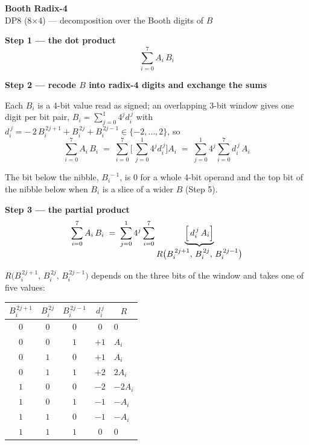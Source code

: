 \documentclass[fleqn]{article}
\newcommand{\Rf}{R\bigl(B_i^{\,2j+1},\, B_i^{\,2j},\, B_i^{\,2j-1}\bigr)}
\begin{document}
\begin{center}
{\LARGE \textbf{Booth Radix-4}}\\[4pt]
{\large DP8 (8$\times$4) --- decomposition over the Booth digits of $B$}
\end{center}

\vspace{1.5em}

\noindent\textbf{Step 1 --- the dot product}
\[
\sum_{i=0}^{7} A_i \, B_i
\]

\vspace{0.5em}

\noindent\textbf{Step 2 --- recode $B$ into radix-4 digits and exchange the sums}

\noindent Each $B_i$ is a 4-bit value read as signed; an overlapping 3-bit window gives one
digit per bit pair, $B_i = \sum_{j=0}^{1} 4^{j} d_i^{\,j}$ with
$d_i^{\,j} = -\,2\,B_i^{\,2j+1} + B_i^{\,2j} + B_i^{\,2j-1} \in \{-2,\dots,2\}$, so
\[
\sum_{i=0}^{7} A_i \, B_i
  \;=\; \sum_{i=0}^{7} \Biggl[\, \sum_{j=0}^{1} 4^{j} d_i^{\,j} \Biggr] A_i
  \;=\; \sum_{j=0}^{1} 4^{j} \sum_{i=0}^{7} d_i^{\,j} \, A_i
\]

\noindent The bit below the nibble, $B_i^{\,-1}$, is $0$ for a whole 4-bit operand and the
top bit of the nibble below when $B_i$ is a slice of a wider $B$ (Step 5).

\vspace{0.5em}

\noindent\textbf{Step 3 --- the partial product}
\[
\sum_{i=0}^{7} A_i \, B_i
  \;=\; \sum_{j=0}^{1} 4^{j} \sum_{i=0}^{7}
        \underbrace{\Bigl[\, d_i^{\,j} \, A_i \Bigr]}_{\textstyle \Rf}
\]

\noindent $\Rf$ depends on the three bits of the window and takes one of five values:

\vspace{0.5em}

\begin{center}
\renewcommand{\arraystretch}{1.2}
\begin{tabular}{c c c | c | l}
$B_i^{\,2j+1}$ & $B_i^{\,2j}$ & $B_i^{\,2j-1}$ & $d_i^{\,j}$ & \multicolumn{1}{c}{$R$} \\
\hline
$0$ & $0$ & $0$ & $0$  & $0$ \\
$0$ & $0$ & $1$ & $+1$ & $A_i$ \\
$0$ & $1$ & $0$ & $+1$ & $A_i$ \\
$0$ & $1$ & $1$ & $+2$ & $2A_i$ \\
$1$ & $0$ & $0$ & $-2$ & $-2A_i$ \\
$1$ & $0$ & $1$ & $-1$ & $-A_i$ \\
$1$ & $1$ & $0$ & $-1$ & $-A_i$ \\
$1$ & $1$ & $1$ & $0$  & $0$ \\
\end{tabular}
\end{center}
\end{document}
